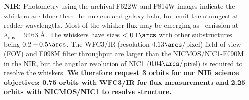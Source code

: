 \documentclass[11pt]{article}
\begin{document}
\describeobservations





{\bf{NIR:}} Photometry using the archival F622W and F814W images
indicate the whiskers are bluer than the nucleus and galaxy halo, but
emit the strongest at redder wavelengths. Most of the whisker flux may
be emerging as \halpha\ emission at $\lambda_{\mathrm{obs}} = 9463$
\AA. The whiskers have sizes $< 0.1\arcs$ with other substructures
being $0.2-0.5\arcs$. The WFC3/IR (resolution $0.13\arcs/$pixel) field
of view (FOV) and F098M filter throughput are larger than the
NICMOS/NIC1-F090M in the NIR, but the angular resolution of NIC1
($0.04\arcs/$pixel) is required to resolve the whiskers. {\bf{We
    therefore request 3 orbits for our NIR science objectives: 0.75
    orbits with WFC3/IR for flux measurements and 2.25 orbits with
    NICMOS/NIC1 to resolve structure.}}
\end{document}
